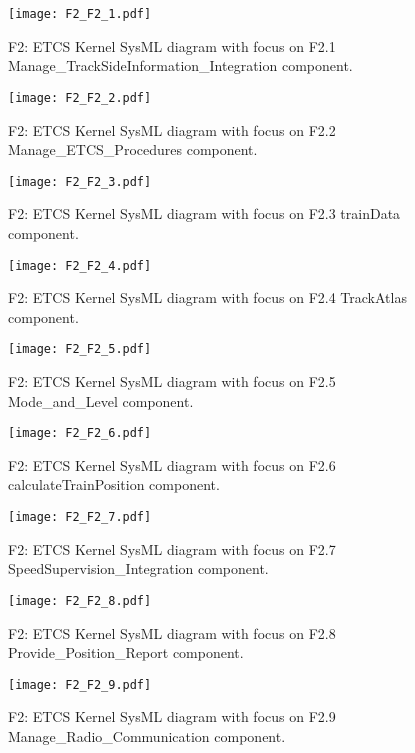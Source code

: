 \begin{figure}
\center
\texttt{[image: F2\_F2\_1.pdf]}
\caption{F2: ETCS Kernel SysML diagram with focus on F2.1 Manage\_TrackSideInformation\_Integration component.}\label{f:f2.1_overview}
\end{figure}

\begin{figure}
\center
\texttt{[image: F2\_F2\_2.pdf]}
\caption{F2: ETCS Kernel SysML diagram with focus on F2.2 Manage\_ETCS\_Procedures component.}\label{f:f2.2_overview}
\end{figure}

\begin{figure}
\center
\texttt{[image: F2\_F2\_3.pdf]}
\caption{F2: ETCS Kernel SysML diagram with focus on F2.3 trainData component.}\label{f:f2.3_overview}
\end{figure}

\begin{figure}
\center
\texttt{[image: F2\_F2\_4.pdf]}
\caption{F2: ETCS Kernel SysML diagram with focus on F2.4 TrackAtlas component.}\label{f:f2.4_overview}
\end{figure}

\begin{figure}
\center
\texttt{[image: F2\_F2\_5.pdf]}
\caption{F2: ETCS Kernel SysML diagram with focus on F2.5 Mode\_and\_Level component.}\label{f:f2.5_overview}
\end{figure}

\begin{figure}
\center
\texttt{[image: F2\_F2\_6.pdf]}
\caption{F2: ETCS Kernel SysML diagram with focus on F2.6 calculateTrainPosition component.}\label{f:f2.6_overview}
\end{figure}

\begin{figure}
\center
\texttt{[image: F2\_F2\_7.pdf]}
\caption{F2: ETCS Kernel SysML diagram with focus on F2.7 SpeedSupervision\_Integration component.}\label{f:f2.7_overview}
\end{figure}

\begin{figure}
\center
\texttt{[image: F2\_F2\_8.pdf]}
\caption{F2: ETCS Kernel SysML diagram with focus on F2.8 Provide\_Position\_Report component.}\label{f:f2.8_overview}
\end{figure}

\begin{figure}
\center
\texttt{[image: F2\_F2\_9.pdf]}
\caption{F2: ETCS Kernel SysML diagram with focus on F2.9 Manage\_Radio\_Communication component.}\label{f:f2.9_overview}
\end{figure}

